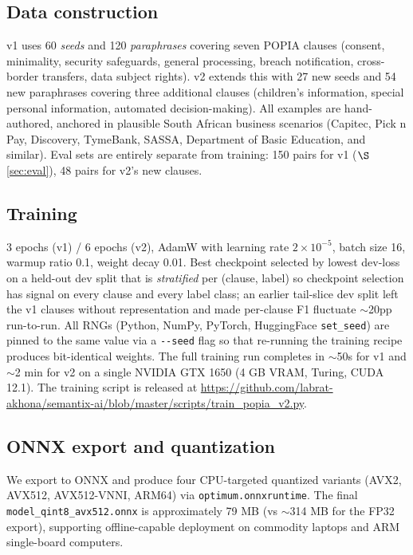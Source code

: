 \documentclass[11pt]{article}
\begin{document}
\subsection{Data construction}
v1 uses 60 \emph{seeds} and 120 \emph{paraphrases} covering seven POPIA clauses (consent, minimality, security safeguards, general processing, breach notification, cross-border transfers, data subject rights). v2 extends this with 27 new seeds and 54 new paraphrases covering three additional clauses (children's information, special personal information, automated decision-making). All examples are hand-authored, anchored in plausible South African business scenarios (Capitec, Pick n Pay, Discovery, TymeBank, SASSA, Department of Basic Education, and similar). Eval sets are entirely separate from training: 150 pairs for v1 ($\S$\ref{sec:eval}), 48 pairs for v2's new clauses.

\subsection{Training}
3 epochs (v1) / 6 epochs (v2), AdamW with learning rate $2 \times 10^{-5}$, batch size 16, warmup ratio 0.1, weight decay 0.01. Best checkpoint selected by lowest dev-loss on a held-out dev split that is \emph{stratified} per (clause, label) so checkpoint selection has signal on every clause and every label class; an earlier tail-slice dev split left the v1 clauses without representation and made per-clause F1 fluctuate $\sim$20pp run-to-run. All RNGs (Python, NumPy, PyTorch, HuggingFace \texttt{set\_seed}) are pinned to the same value via a \texttt{-{}-seed} flag so that re-running the training recipe produces bit-identical weights. The full training run completes in $\sim$50s for v1 and $\sim$2 min for v2 on a single NVIDIA GTX 1650 (4 GB VRAM, Turing, CUDA 12.1). The training script is released at \url{https://github.com/labrat-akhona/semantix-ai/blob/master/scripts/train_popia_v2.py}.

\subsection{ONNX export and quantization}
We export to ONNX and produce four CPU-targeted quantized variants (AVX2, AVX512, AVX512-VNNI, ARM64) via \texttt{optimum.onnxruntime}. The final \texttt{model\_qint8\_avx512.onnx} is approximately 79 MB (vs $\sim$314 MB for the FP32 export), supporting offline-capable deployment on commodity laptops and ARM single-board computers.
\end{document}
